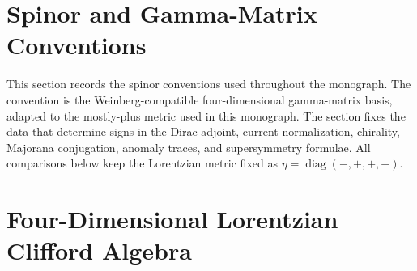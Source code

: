 \section{Spinor and Gamma-Matrix Conventions}
\label{sec:spinor-conventions}

This section records the spinor conventions used throughout the monograph.
The convention is the Weinberg-compatible four-dimensional gamma-matrix
basis, adapted to the mostly-plus metric used in this monograph.  The section
fixes the data that determine signs in the Dirac adjoint, current
normalization, chirality, Majorana conjugation, anomaly traces, and
supersymmetry formulae.  All comparisons below keep the Lorentzian metric
fixed as \(\eta=\operatorname{diag}(-,+,+,+)\).

\section{Four-Dimensional Lorentzian Clifford Algebra}

